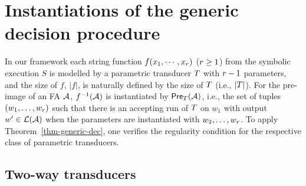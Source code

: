 
\section{Instantiations of the generic decision procedure}\label{sec-instan}

In our framework each string function $f(x_1, \cdots, x_r)$ ($r\geq 1$) from the symbolic execution $S$ is modelled by a parametric transducer $T$  
with $r-1$ parameters, and the size of $f$, $|f|$, is naturally defined by the size of $T$ (i.e., $|T|$). 
For the pre-image of an FA $\mathcal{A}$,  %
$f^{-1}(\mathcal{A})$ is instantiated by $\textsf{Pre}_{T}(\mathcal{A})$, i.e.,  the set of tuples $(w_1,\ldots, w_r)$ such that there is an accepting run of $T$ on $w_1$ with output $w'\in \mathcal{L}(\mathcal{A})$ when the parameters are instantiated with $w_2,\ldots, w_r$. To apply Theorem~\ref{thm-generic-dec}, one verifies the regularity condition \prerec{} for the respective class of parametric transducers. %



 
\subsection{Two-way transducers}\label{sec-2way}



